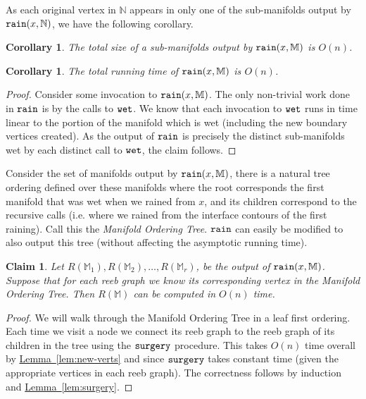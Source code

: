 \documentclass[11pt]{article}
\newtheorem{claim}[theorem]{Claim}
\newtheorem{corollary}[theorem]{Corollary}
\theoremstyle{definition}
\newcommand{\MM}{\mathbb{M}}
\newcommand{\NN}{\mathbb{N}}
\newcommand{\Lem}[1]{\hyperref[lem:#1]{Lemma~\ref*{lem:#1}}} %
\newcommand{\rain}{{\tt rain}}
\newcommand{\reeb}{R}
\newcommand{\surgery}{{\tt surgery}}
\newcommand{\wet}{{\tt wet}}
\begin{document}
As each original vertex in $\NN$ appears in only one of the sub-manifolds output by $\rain(x,\NN)$, we have the following corollary.

\begin{corollary}
The total size of a sub-manifolds output by $\rain(x,\MM)$ is $O(n)$.
\end{corollary}

\begin{corollary} \label{cor:rain-time} The total running time of $\rain(x,\MM)$ is $O(n)$.
\end{corollary}

\begin{proof} Consider some invocation to $\rain(x,\MM)$. The only non-trivial work done in $\rain$ is by the calls to $\wet$.
We know that each invocation to $\wet$ runs in time linear 
to the portion of the manifold which is wet (including the new boundary vertices created).  
As the output of $\rain$ is precisely the distinct sub-manifolds wet by each distinct call to $\wet$, the claim follows.
\end{proof}

Consider the set of manifolds output by $\rain(x,\MM)$, there is a natural tree ordering defined over these manifolds where the 
root corresponds the first manifold that was wet when we rained from $x$, and its children correspond to the recursive calls 
(i.e. where we rained from the interface contours of the first raining).  Call this the \emph{Manifold Ordering Tree}.
$\rain$ can easily be modified to also output this tree (without affecting the asymptotic running time).  


\begin{claim} \label{clm:rain-reeb} Let $\reeb(\MM_1), \reeb(\MM_2), \ldots, \reeb(\MM_r)$, 
be the output of $\rain(x,\MM)$. Suppose that for each reeb graph we know its corresponding vertex in the Manifold Ordering Tree. 
Then $\reeb(\MM)$ can be computed in $O(n)$ time.
\end{claim}

\begin{proof}
We will walk through the Manifold Ordering Tree in a leaf first ordering.  Each time we visit a node we connect its reeb graph to the 
reeb graph of its children in the tree using the $\surgery$ procedure. This takes $O(n)$ time overall by \Lem{new-verts} and since $\surgery$ takes constant time (given the appropriate vertices in each reeb graph).  The correctness follows by induction and  \Lem{surgery}.
\end{proof}
\end{document}
